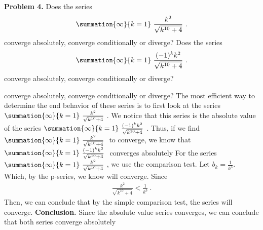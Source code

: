 \documentclass{report}
\begin{document}
    \pagebreak 
    \begin{mdframed}
        \textbf{Problem 4.} Does the series 
        \begin{align*}
            \summation{\infty}{k=1}\ \frac{k^{2}}{\sqrt{k^{10} + 4}}\ 
        .\end{align*}
     converge absolutely, converge conditionally or diverge?
     \bigbreak \noindent 
     Does the series 
     \begin{align*}
         \summation{\infty}{k=1}\ \frac{(-1)^{k}k^{2}}{\sqrt{k^{10} + 4}}\ 
     .\end{align*}
     converge absolutely, converge conditionally or diverge?
    \end{mdframed}
    \bigbreak \noindent 
          converge absolutely, converge conditionally or diverge?
      \bigbreak \noindent 
      The most efficient way to determine the end behavior of these series is to first look at the series $\summation{\infty}{k=1}\ \frac{k^{2}}{\sqrt{k^{10}+4}}\  $. We notice that this series is the absolute value of the series $\summation{\infty}{k=1}\ \frac{(-1)^{k}k^{2}}{\sqrt{k^{10}+4}}\ $. Thus, if we find $\summation{\infty}{k=1}\ \frac{k^{2}}{\sqrt{k^{10}+4}}\  $ to converge, we know that $\summation{\infty}{k=1}\ \frac{(-1)^{k}k^{2}}{\sqrt{k^{10}+4} }\  $ converges absolutely
      \bigbreak \noindent 
      For the series $\summation{\infty}{k=1}\ \frac{k^{2}}{\sqrt{k^{10} +4}}\  $, we use the comparison test. Let $b_{k} =  \frac{1}{k^{3}}$. Which, by the p-series, we know will converge. Since
      \begin{align*}
          \frac{k^{2}}{\sqrt{k^{10} + 4}} < \frac{1}{k^{3}}\
      .\end{align*}
      \bigbreak \noindent 
      Then, we can conclude that by the simple comparison test, the series will converge. 
      \bigbreak \noindent 
      \textbf{Conclusion.} Since the absolute value series converges, we can conclude that both series converge absolutely
\end{document}
